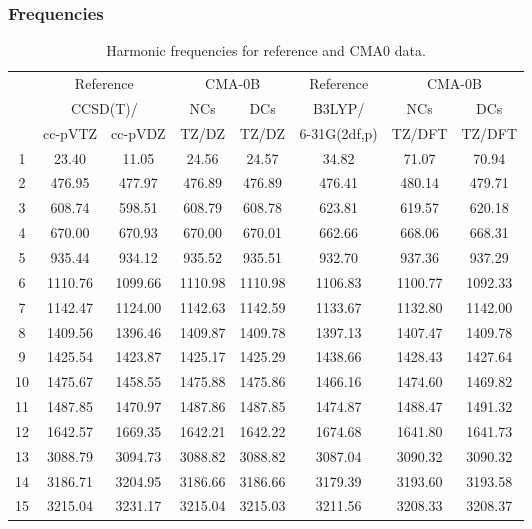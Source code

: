 \documentclass[10pt,oneside]{article}
\begin{document}
\subsubsection*{Frequencies}
\begin{table}[h!]
\centering
\caption{Harmonic frequencies for reference and CMA0 data.}
\begin{tabular}{cccccccc}
\toprule
{} & \multicolumn{2}{c}{Reference} & \multicolumn{2}{c}{CMA-0B} &    Reference & \multicolumn{2}{c}{CMA-0B} \\
{} & \multicolumn{2}{c}{CCSD(T)/} &     NCs &     DCs &       B3LYP/ &     NCs &     DCs \\
{} &   cc-pVTZ & cc-pVDZ &   TZ/DZ &   TZ/DZ & 6-31G(2df,p) &  TZ/DFT &  TZ/DFT \\
\midrule
1  &     23.40 &   11.05 &   24.56 &   24.57 &        34.82 &   71.07 &   70.94 \\
2  &    476.95 &  477.97 &  476.89 &  476.89 &       476.41 &  480.14 &  479.71 \\
3  &    608.74 &  598.51 &  608.79 &  608.78 &       623.81 &  619.57 &  620.18 \\
4  &    670.00 &  670.93 &  670.00 &  670.01 &       662.66 &  668.06 &  668.31 \\
5  &    935.44 &  934.12 &  935.52 &  935.51 &       932.70 &  937.36 &  937.29 \\
6  &   1110.76 & 1099.66 & 1110.98 & 1110.98 &      1106.83 & 1100.77 & 1092.33 \\
7  &   1142.47 & 1124.00 & 1142.63 & 1142.59 &      1133.67 & 1132.80 & 1142.00 \\
8  &   1409.56 & 1396.46 & 1409.87 & 1409.78 &      1397.13 & 1407.47 & 1409.78 \\
9  &   1425.54 & 1423.87 & 1425.17 & 1425.29 &      1438.66 & 1428.43 & 1427.64 \\
10 &   1475.67 & 1458.55 & 1475.88 & 1475.86 &      1466.16 & 1474.60 & 1469.82 \\
11 &   1487.85 & 1470.97 & 1487.86 & 1487.85 &      1474.87 & 1488.47 & 1491.32 \\
12 &   1642.57 & 1669.35 & 1642.21 & 1642.22 &      1674.68 & 1641.80 & 1641.73 \\
13 &   3088.79 & 3094.73 & 3088.82 & 3088.82 &      3087.04 & 3090.32 & 3090.32 \\
14 &   3186.71 & 3204.95 & 3186.66 & 3186.66 &      3179.39 & 3193.60 & 3193.58 \\
15 &   3215.04 & 3231.17 & 3215.04 & 3215.03 &      3211.56 & 3208.33 & 3208.37 \\
\bottomrule
\end{tabular}
\end{table}
\end{document}
